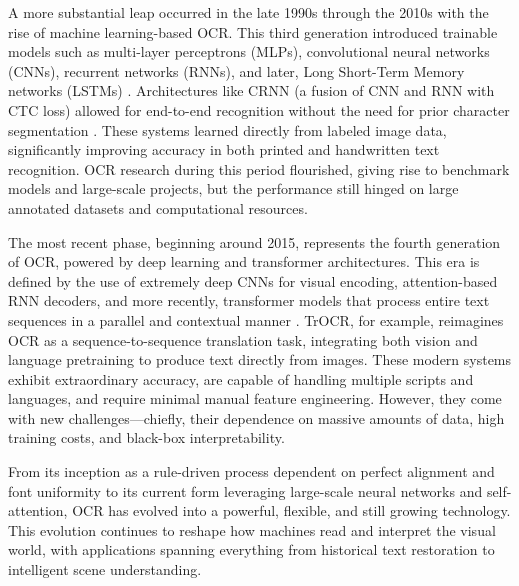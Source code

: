 A more substantial leap occurred in the late 1990s through the 2010s with the rise of machine learning-based OCR. This third generation introduced trainable models such as multi-layer perceptrons (MLPs), convolutional neural networks (CNNs), recurrent networks (RNNs), and later, Long Short-Term Memory networks (LSTMs) \cite{lecun1998gradient, graves2009offline}. Architectures like CRNN (a fusion of CNN and RNN with CTC loss) allowed for end-to-end recognition without the need for prior character segmentation \cite{shi2017crnn}. These systems learned directly from labeled image data, significantly improving accuracy in both printed and handwritten text recognition. OCR research during this period flourished, giving rise to benchmark models and large-scale projects, but the performance still hinged on large annotated datasets and computational resources.

The most recent phase, beginning around 2015, represents the fourth generation of OCR, powered by deep learning and transformer architectures. This era is defined by the use of extremely deep CNNs for visual encoding, attention-based RNN decoders, and more recently, transformer models that process entire text sequences in a parallel and contextual manner \cite{li2021trocr}. TrOCR, for example, reimagines OCR as a sequence-to-sequence translation task, integrating both vision and language pretraining to produce text directly from images. These modern systems exhibit extraordinary accuracy, are capable of handling multiple scripts and languages, and require minimal manual feature engineering. However, they come with new challenges—chiefly, their dependence on massive amounts of data, high training costs, and black-box interpretability.

From its inception as a rule-driven process dependent on perfect alignment and font uniformity to its current form leveraging large-scale neural networks and self-attention, OCR has evolved into a powerful, flexible, and still growing technology. This evolution continues to reshape how machines read and interpret the visual world, with applications spanning everything from historical text restoration to intelligent scene understanding.



